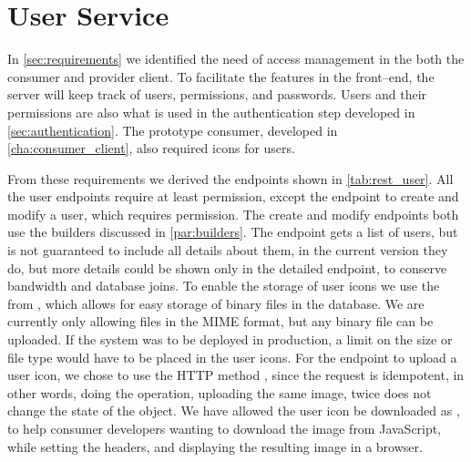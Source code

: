 \section{User Service}\label{sec:userservice}

In \cref{sec:requirements} we identified the need of access management in the
both the consumer and provider client. To facilitate the features in the
front--end, the server will keep track of users, permissions, and passwords.
Users and their permissions are also what is used in the authentication step
developed in \cref{sec:authentication}. The prototype consumer, developed in
\cref{cha:consumer_client}, also required icons for users.


From these requirements we derived the endpoints shown in \cref{tab:rest_user}.
All the user endpoints require at least  permission, except the
endpoint to create and modify a user, which requires 
permission. The create and modify endpoints both use the builders discussed in
\cref{par:builders}. The  endpoint gets a list of users,
but is not guaranteed to include all details about them, in the current version
they do, but more details could be shown only in the detailed 
endpoint, to conserve bandwidth and database joins. To enable the storage of
user icons we use the  from ,
which allows for easy storage of binary files in the database. We are currently
only allowing files in the  \ac{MIME} format, but any binary
file can be uploaded.  If the system was to be deployed in production, a limit
on the size or file type would have to be placed in the user icons. For the
endpoint to upload a user icon, we chose to use the HTTP method ,
since the request is idempotent, in other words, doing the operation, uploading
the same image, twice does not change the state of the object. We have allowed
the user icon be downloaded as , to help consumer developers
wanting to download the image from JavaScript, while setting the headers, and
displaying the resulting image in a browser.

